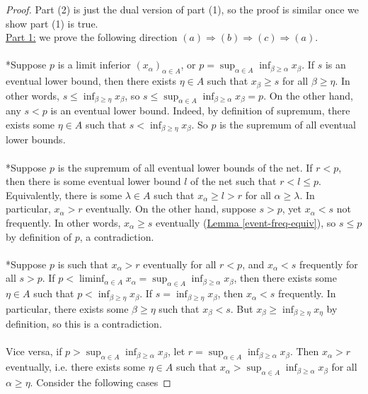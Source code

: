\documentclass{treatise}
\begin{document}
\begin{proof}
Part (2) is just the dual version of part (1), so the proof is similar once we show part (1) is true.
\\
\underline{Part 1:} we prove the following direction $(a) \Rightarrow (b) \Rightarrow (c) \Rightarrow (a)$.
\\
\\
*Suppose $p$ is a limit inferior $(x_\alpha)_{\alpha \in A}$, or $p = \sup_{\alpha \in A} \inf_{\beta \geq \alpha} x_\beta$. If $s$ is an eventual lower bound, then there exists $\eta \in A$ such that $x_\beta \geq s$ for all $\beta \geq \eta$. In other words, $s \leq \inf_{\beta \geq \eta} x_\beta$, so $s \leq \sup_{\alpha \in A} \inf_{\beta \geq \alpha} x_\beta = p$. On the other hand, any $s < p$ is an eventual lower bound. Indeed, by definition of supremum, there exists some $\eta \in A$ such that $s < \inf_{\beta \geq \eta} x_\beta$. So $p$ is the supremum of all eventual lower bounds.
\\
\\
*Suppose $p$ is the supremum of all eventual lower bounds of the net. If $r < p$, then there is some eventual lower bound $l$ of the net such that $r < l \leq p$. Equivalently, there is some $\lambda \in A$ such that $x_\alpha \geq l > r$ for all $\alpha \geq \lambda$. In particular, $x_\alpha > r$ eventually. On the other hand, suppose $s > p$, yet $x_\alpha < s$ not frequently. In other words, $x_\alpha \geq s$ eventually (\hyperref[event-freq-equiv]{Lemma \ref*{event-freq-equiv}}), so $s \leq p$ by definition of $p$, a contradiction.
\\
\\
*Suppose $p$ is such that $x_\alpha > r$ eventually for all $r < p$, and $x_\alpha < s$ frequently for all $s > p$. If $p < \liminf_{\alpha \in A} x_\alpha = \sup_{\alpha \in A} \inf_{\beta \geq \alpha} x_\beta$, then there exists some $\eta \in A$ such that $p < \inf_{\beta \geq \eta} x_\beta$. If $s = \inf_{\beta \geq \eta} x_\beta$, then $x_\alpha < s$ frequently. In particular, there exists some $\beta \geq \eta$ such that $x_\beta < s$. But $x_\beta \geq \inf_{\beta \geq \eta} x_\eta$ by definition, so this is a contradiction.
\\
\\
Vice versa, if $p > \sup_{\alpha \in A} \inf_{\beta \geq \alpha} x_\beta$, let $r = \sup_{\alpha \in A} \inf_{\beta \geq \alpha} x_\beta$. Then $x_\alpha > r$ eventually, i.e. there exists some $\eta \in A$ such that $x_\alpha > \sup_{\alpha \in A} \inf_{\beta \geq \alpha} x_\beta$ for all $\alpha \geq \eta$. Consider the following cases

\end{proof}
\end{document}
